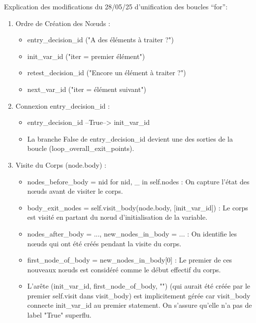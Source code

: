 \documentclass[11pt,a4paper]{article}
\begin{document}
\begin{description}
    \item[Explication des modifications du 28/05/25 d'unification des boucles ``for'':]
\end{description}

\begin{enumerate}
    
    \item Ordre de Création des Nœuds :
    \begin{itemize}
        \item entry\_decision\_id ("A des éléments à traiter ?")
        \item init\_var\_id ("iter = premier élément")
        \item retest\_decision\_id ("Encore un élément à traiter ?")
        \item next\_var\_id ("iter = élément suivant")
    \end{itemize}

    \item Connexion entry\_decision\_id :
    \begin{itemize}
        \item entry\_decision\_id --True--> init\_var\_id
        \item La branche False de entry\_decision\_id devient une des sorties de la boucle (loop\_overall\_exit\_points).
    \end{itemize}    

    \item Visite du Corps (node.body) :
    \begin{itemize}
        \item nodes\_before\_body = {nid for nid, \_ in self.nodes} : On capture l'état des nœuds avant de visiter le corps.
        \item body\_exit\_nodes = self.visit\_body(node.body, [init\_var\_id]) : Le corps est visité en partant du nœud d'initialisation de la variable.
        \item nodes\_after\_body = ..., new\_nodes\_in\_body = ... : On identifie les nœuds qui ont été créés pendant la visite du corps.
        \item first\_node\_of\_body = new\_nodes\_in\_body[0] : Le premier de ces nouveaux nœuds est considéré comme le début effectif du corps.
        \item L'arête (init\_var\_id, first\_node\_of\_body, "") (qui aurait été créée par le premier self.visit dans visit\_body) est implicitement gérée car visit\_body connecte init\_var\_id au premier statement. On s'assure qu'elle n'a pas de label "True" superflu.
    \end{itemize}


\end{enumerate}
\end{document}
